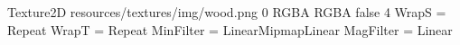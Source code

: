 Texture2D
resources/textures/img/wood.png
0
RGBA
RGBA
false
4
WrapS = Repeat
WrapT = Repeat
MinFilter = LinearMipmapLinear
MagFilter = Linear
